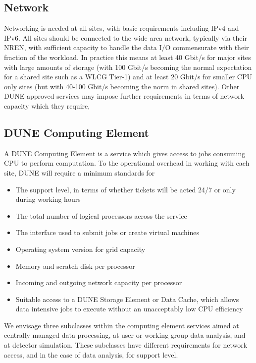 \subsection{Network}
\label{sec:cm:network}

Networking is needed at all sites, with basic requirements including IPv4 and IPv6.
All sites should be connected to the wide area network, typically via their NREN, with sufficient capacity to handle the data I/O commensurate with their fraction of the workload. In practice this means at least 40 Gbit/s for major sites with large amounts of storage (with 100 Gbit/s becoming the normal expectation for a shared site such as a WLCG Tier-1) and at least 20 Gbit/s for smaller CPU only sites (but with 40-100 Gbit/s becoming the norm in shared sites).
Other DUNE approved services may impose further requirements in terms of network capacity which they require,

\subsection{DUNE Computing Element}
\label{sec:cm:dce}

A DUNE Computing Element is a service which gives access to jobs consuming CPU to perform computation. To the operational overhead in working with each site, DUNE will require a minimum standards for

\begin{itemize}
    \item The support level, in terms of whether tickets will be acted 24/7 or only during working hours
    \item The total number of logical processors across the service
    \item The interface used to submit jobs or create virtual machines
    \item Operating system version for grid capacity
    \item Memory and scratch disk per processor
    \item Incoming and outgoing network capacity per processor
    \item Suitable access to a DUNE Storage Element or Data Cache, which allows data intensive jobs to execute without an unacceptably low CPU efficiency
\end{itemize}

We envisage three subclasses within the computing element services aimed at centrally managed data processing, at user or working group data analysis, and at detector simulation. These subclasses have different requirements for network access, and in the case of data analysis, for support level.

